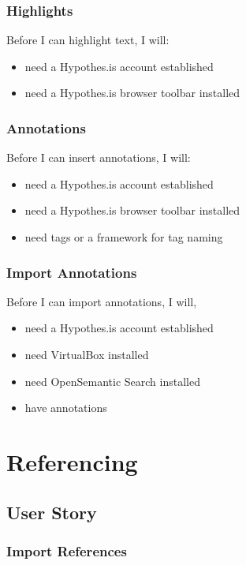 \documentclass{article}
\begin{document}
\subsubsection*{Highlights}

Before I can highlight text, I will:
\begin{itemize}
\item need a Hypothes.is account established
\item need a Hypothes.is browser toolbar installed
\end{itemize}

\subsubsection*{Annotations}

Before I can insert annotations, I will:
\begin{itemize}
\item need a Hypothes.is account established
\item need a Hypothes.is browser toolbar installed
\item need tags or a framework for tag naming
\end{itemize}

\subsubsection*{Import Annotations}

Before I can import annotations, I will, 
\begin{itemize}
\item need a Hypothes.is account established
\item need VirtualBox installed
\item need OpenSemantic Search installed
\item have annotations
\end{itemize}

\section*{Referencing}

\subsection*{User Story}

\subsubsection*{Import References}
\end{document}
